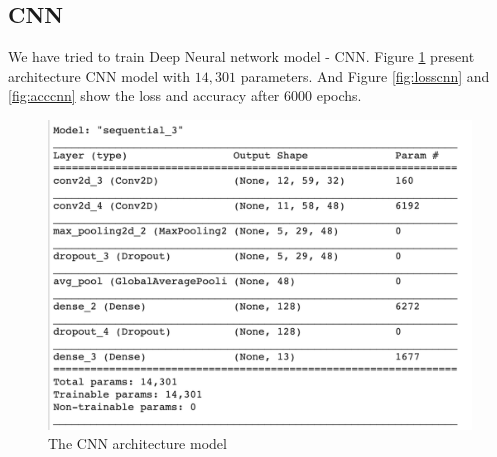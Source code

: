 \documentclass[%
  article,%
  10pt,%
  a4paper,%
  fleqn,%
  oneside,%
  sumario = tradicional,%
  chapter = TITLE,%
  section = TITLE,%
]{abntex2}
\begin{document}
\subsection{CNN}
We have tried to train Deep Neural network model - CNN. Figure \ref{fig:cnnarch} present architecture CNN model with $14,301$ parameters. And Figure \ref{fig:losscnn} and \ref{fig:acccnn} show the loss and accuracy after 6000 epochs.
\begin{figure}[H]
  \centering
  \includegraphics[width = 0.7\columnwidth]{./Figuras/cnnarch}
   \caption{The CNN architecture model}
   \label{fig:cnnarch}
\end{figure}
\end{document}
